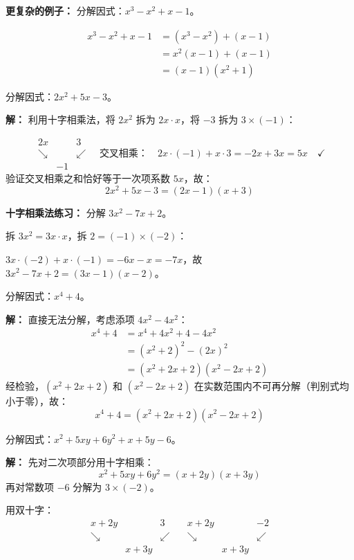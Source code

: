 \documentclass[12pt, a4paper]{ctexart}
\begin{document}
\textbf{更复杂的例子：} 分解因式：$x^3 - x^2 + x - 1$。

\begin{align*}
x^3 - x^2 + x - 1 &= (x^3 - x^2) + (x - 1) \\
&= x^2(x-1) + (x-1) \\
&= (x-1)(x^2+1)
\end{align*}

\begin{examplebox}[【例17】十字相乘法]
分解因式：$2x^2 + 5x - 3$。
\end{examplebox}

\textbf{解：} 利用十字相乘法，将 $2x^2$ 拆为 $2x \cdot x$，将 $-3$ 拆为 $3 \times (-1)$：

\[
\begin{array}{ccc}
2x & & 3 \\
\searrow & & \swarrow \\
& -1 &
\end{array}
\quad \text{交叉相乘：} \quad 2x \cdot(-1) + x \cdot 3 = -2x + 3x = 5x \quad \checkmark
\]
验证交叉相乘之和恰好等于一次项系数 $5x$，故：
\[
2x^2 + 5x - 3 = \boxed{(2x-1)(x+3)}
\]

\textbf{十字相乘法练习：} 分解 $3x^2 - 7x + 2$。

拆 $3x^2 = 3x \cdot x$，拆 $2 = (-1)\times(-2)$：

$3x \cdot (-2) + x \cdot (-1) = -6x - x = -7x$，故 $3x^2 - 7x + 2 = (3x-1)(x-2)$。

\begin{examplebox}[【例18】拆项添项法]
分解因式：$x^4 + 4$。
\end{examplebox}

\textbf{解：} 直接无法分解，考虑添项 $4x^2 - 4x^2$：
\begin{align*}
x^4 + 4 &= x^4 + 4x^2 + 4 - 4x^2 \\
&= (x^2+2)^2 - (2x)^2 \\
&= (x^2 + 2x + 2)(x^2 - 2x + 2)
\end{align*}
经检验，$(x^2+2x+2)$ 和 $(x^2-2x+2)$ 在实数范围内不可再分解（判别式均小于零），故：
\[
x^4 + 4 = \boxed{(x^2+2x+2)(x^2-2x+2)}
\]

\begin{examplebox}[【例19】双十字相乘法]
分解因式：$x^2 + 5xy + 6y^2 + x + 5y - 6$。
\end{examplebox}

\textbf{解：} 先对二次项部分用十字相乘：
\[
x^2 + 5xy + 6y^2 = (x+2y)(x+3y)
\]
再对常数项 $-6$ 分解为 $3 \times (-2)$。

用双十字：
\[
\begin{array}{ccc}
x + 2y & & 3 \\
\searrow & & \swarrow \\
& x + 3y &
\end{array}
\quad
\begin{array}{ccc}
x + 2y & & -2 \\
\searrow & & \swarrow \\
& x + 3y &
\end{array}
\]
\end{document}
